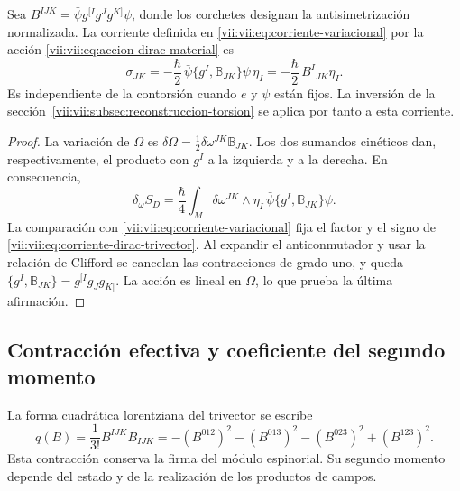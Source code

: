\begin{proposition}
\label{vii:vii:prop:corriente-dirac-explicita}
Sea
\(B^{IJK}=\bar\psi g^{[I}g^Jg^{K]}\psi\), donde los corchetes
designan la antisimetrización normalizada. La corriente definida en
\eqref{vii:vii:eq:corriente-variacional} por la acción
\eqref{vii:vii:eq:accion-dirac-material} es
\begin{equation}
 \sigma_{JK}
 =-\frac{\hbar}{2}\,
   \bar\psi\{g^I,\mathbb B_{JK}\}\psi\,\eta_I
 =-\frac{\hbar}{2}\,B^I{}_{JK}\eta_I.
 \label{vii:vii:eq:corriente-dirac-trivector}
\end{equation}
Es independiente de la contorsión cuando \(e\) y \(\psi\) están
fijos. La inversión de la sección~\ref{vii:vii:subsec:reconstruccion-torsion}
se aplica por tanto a esta corriente.
\end{proposition}
\begin{proof}
La variación de \(\Omega\) es
\(\delta\Omega=\frac12\delta\omega^{JK}\mathbb B_{JK}\).
Los dos sumandos cinéticos dan, respectivamente, el producto con
\(g^I\) a la izquierda y a la derecha. En consecuencia,
\[
 \delta_\omega S_D
 =\frac{\hbar}{4}\int_M\delta\omega^{JK}\wedge\eta_I\,
                 \bar\psi\{g^I,\mathbb B_{JK}\}\psi.
\]
La comparación con \eqref{vii:vii:eq:corriente-variacional} fija el
factor y el signo de \eqref{vii:vii:eq:corriente-dirac-trivector}.
Al expandir el anticonmutador y usar la relación de Clifford se
cancelan las contracciones de grado uno, y queda
\(\{g^I,\mathbb B_{JK}\}=g^{[I}g_Jg_{K]}\).
La acción es lineal en \(\Omega\), lo que prueba la última
afirmación.
\end{proof}

\subsection{Contracción efectiva y coeficiente del segundo momento}
\label{vii:vii:subsec:contraccion-espinorial}

La forma cuadrática lorentziana del trivector se escribe
\begin{equation}
 q(B)=\frac1{3!}B^{IJK}B_{IJK}
 =-(B^{012})^2-(B^{013})^2-(B^{023})^2+(B^{123})^2.
 \label{vii:vii:eq:cuadratica-trivector}
\end{equation}
Esta contracción conserva la firma del módulo espinorial. Su segundo
momento depende del estado y de la realización de los productos de
campos.

